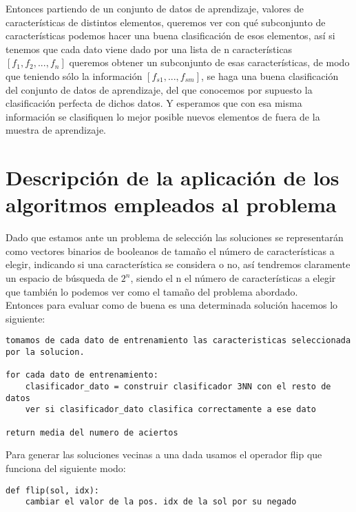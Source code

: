 \documentclass[10pt,a4paper]{article}
\begin{document}
Entonces partiendo de un conjunto de datos de aprendizaje, valores de características de distintos elementos, queremos ver con qué subconjunto de características podemos hacer una buena clasificación de esos elementos, así si tenemos que cada dato viene dado por una lista de n características $[f_1, f_2, ..., f_n]$ queremos obtener un subconjunto de esas características, de modo que teniendo sólo la información $[f_{s1}, ..., f_{sm}]$, se haga una buena clasificación del conjunto de datos de aprendizaje, del que conocemos por supuesto la clasificación perfecta de dichos datos. Y esperamos que con esa misma información se clasifiquen lo mejor posible nuevos elementos de fuera de la muestra de aprendizaje.\\

\newpage

\section{\color[rgb]{0.0,0.0,0.21}Descripción de la aplicación de los algoritmos empleados al problema}

Dado que estamos ante un problema de selección las soluciones se representarán como vectores binarios de booleanos de tamaño el número de características a elegir, indicando si una característica se considera o no, así tendremos claramente un espacio de búsqueda de $2^n$, siendo el n el número de características a elegir que también lo podemos ver como el tamaño del problema abordado.\\

Entonces para evaluar como de buena es una determinada solución hacemos lo siguiente:\\

\begin{lstlisting}
tomamos de cada dato de entrenamiento las caracteristicas seleccionada por la solucion.

for cada dato de entrenamiento:
	clasificador_dato = construir clasificador 3NN con el resto de datos
	ver si clasificador_dato clasifica correctamente a ese dato
	
return media del numero de aciertos
\end{lstlisting}

Para generar las soluciones vecinas a una dada usamos el operador flip que funciona del siguiente modo:\\

\begin{lstlisting}
def flip(sol, idx):
	cambiar el valor de la pos. idx de la sol por su negado
\end{lstlisting}
\end{document}

